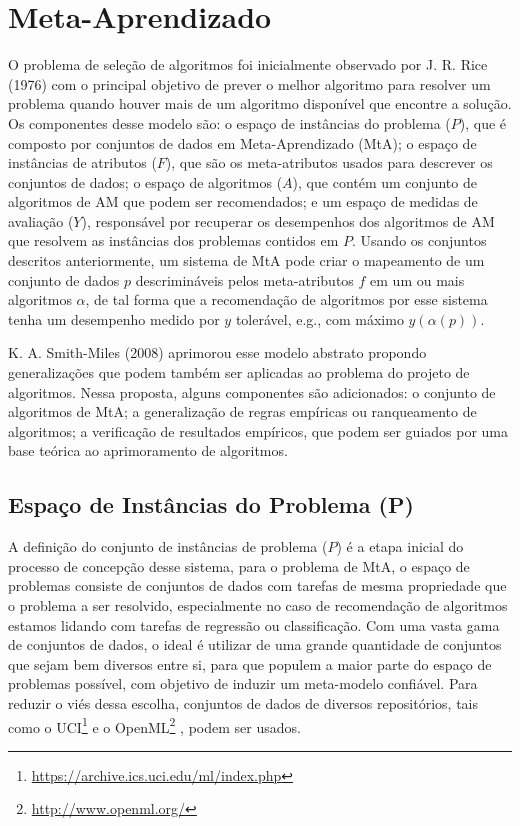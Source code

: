 \section{Meta-Aprendizado}
\label{sec:metalearning}
O problema de seleção de algoritmos foi inicialmente observado por J. R. Rice
(1976) \cite{Rice1976} com o principal objetivo de prever o melhor algoritmo
para resolver um problema quando houver mais de um algoritmo
disponível que encontre a solução.
Os componentes desse modelo são: o espaço de instâncias do problema ($P$), que
é composto por conjuntos de dados em Meta-Aprendizado (MtA); o espaço de
instâncias de atributos ($F$), que são os meta-atributos usados para descrever
os conjuntos de dados; o espaço de algoritmos ($A$), que contém um conjunto de
algoritmos de AM que podem ser recomendados; e um espaço de medidas de
avaliação ($Y$), responsável por recuperar os desempenhos dos algoritmos de AM
que resolvem as instâncias dos problemas contidos em $P$.
Usando os conjuntos descritos anteriormente, um sistema de MtA pode criar o
mapeamento de um conjunto de dados $p$ descrimináveis pelos meta-atributos $f$
em um ou mais algoritmos $\alpha$, de tal forma que a recomendação de
algoritmos por esse sistema tenha um desempenho medido por $y$ tolerável, e.g.,
com máximo $y(\alpha(p))$.

K. A. Smith-Miles (2008) \cite{SmithMiles2008} aprimorou esse modelo abstrato
propondo generalizações que podem também ser aplicadas ao problema do projeto
de algoritmos.  Nessa proposta, alguns componentes são adicionados: o conjunto
de algoritmos de MtA; a generalização de regras empíricas ou ranqueamento de
algoritmos; a verificação de resultados empíricos, que podem ser guiados por
uma base teórica ao aprimoramento de algoritmos.


\subsection{Espaço de Instâncias do Problema (P)}
A definição do conjunto de instâncias de problema ($P$) é a etapa inicial do processo de concepção desse sistema, para o problema de MtA, o espaço de problemas consiste de conjuntos de dados com tarefas de mesma propriedade que o problema a ser resolvido, especialmente no caso de recomendação de algoritmos estamos lidando com tarefas de regressão ou classificação.
Com uma vasta gama de conjuntos de dados, o ideal é utilizar de uma grande quantidade de conjuntos que sejam bem diversos entre si, para que populem a maior parte do espaço de problemas possível, com objetivo de induzir um meta-modelo confiável.
Para reduzir o viés dessa escolha, conjuntos de dados de diversos repositórios,
tais como o UCI\footnote{\url{https://archive.ics.uci.edu/ml/index.php}}
\cite{Lichman2013} e o OpenML\footnote{\url{http://www.openml.org/}}
\cite{OpenML2013}, podem ser usados.

